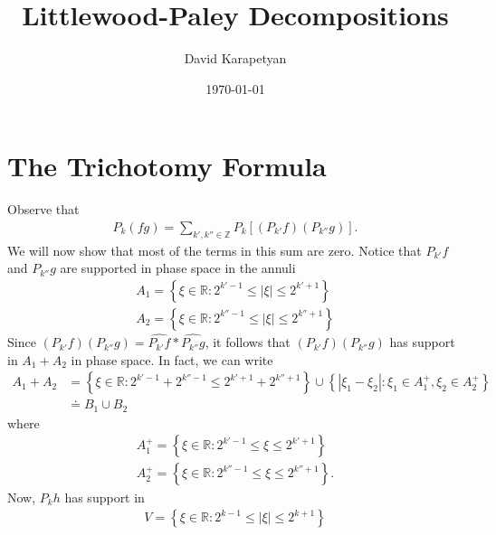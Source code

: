 \documentclass[12pt,reqno]{amsart}
\numberwithin{equation}{section}  %
\newcommand{\rr}{\mathbb{R}}
\newcommand{\zz}{\mathbb{Z}}
\newcommand{\wh}{\widehat}
\begin{document}
\title{Littlewood-Paley Decompositions}
\author{David Karapetyan}
\address{Department of Mathematics  \
  University  of Notre Dame\
    Notre Dame, IN 46556 }
    \date{\today}
    \maketitle
    \section{The Trichotomy Formula}
Observe that
%
%
\begin{equation*}
\begin{split}
  P_{k}(fg) = \sum_{k', k'' \in \zz} P_{k}\left[ (P_{k'}f)(P_{k''}g) \right].
\end{split}
\end{equation*}
%
%
We will now show that most of the terms in this sum are zero. Notice that $P_{k'}f$ and $P_{k''}g$ are supported in phase space in the annuli
%
%
\begin{gather*}
  A_{1} = \left\{ \xi \in \rr: 2^{k'-1} \le | \xi | \le 2^{k' + 1} \right\}
  \\
  A_{2} = \left\{ \xi \in \rr: 2^{k''-1} \le | \xi | \le 2^{k'' + 1} \right\}
\end{gather*}
%
%
Since $(P_{k'}f)(P_{k''}g) = \wh{P_{k'}f} * \wh{P_{k''}g}$, it follows that 
$(P_{k'}f)(P_{k''}g)$ has support in $A_{1} + A_{2}$ in phase space.
In fact, we can write
%
%
\begin{equation*}
\begin{split}
  A_{1} + A_{2} & = \left\{ \xi \in \rr: 2^{k'-1} + 2^{k'' -1} \le 2^{k'+1} + 2^{k''+1}  \right\} \cup \left\{ | \xi_{1} - \xi_{2} |: \xi_{1} \in A_{1}^{+}, \xi_{2} \in A_{2}^{+} \right\} 
  \\
  & \doteq B_{1} \cup B_{2}
\end{split}
\end{equation*}
%
%
where
\begin{gather*}
  A_{1}^{+} = \left\{ \xi \in \rr: 2^{k'-1} \le  \xi  \le 2^{k' + 1} \right\}
  \\
  A_{2}^{+} = \left\{ \xi \in \rr: 2^{k''-1} \le  \xi  \le 2^{k'' + 1} \right\}.
\end{gather*}
Now, $P_{k} h$ has support in 
%
%
\begin{equation*}
\begin{split}
  V = \left\{ \xi \in \rr: 2^{k-1} \le | \xi |  \le 2^{k+1}\right\}
\end{split}
\end{equation*}
\end{document}
